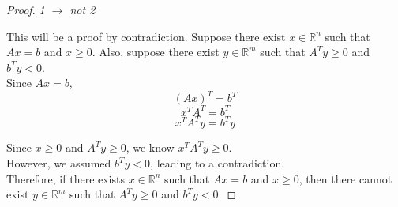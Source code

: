 \documentclass[11pt]{amsart} %
\theoremstyle{definition}
\begin{document}
\begin{proof} \textit{1 \(\xrightarrow{}\) not 2}

This will be a proof by contradiction. Suppose there exist \( x \in \mathbb{R}^n \) such that \( Ax = b \) and \( x \geq 0 \). Also, suppose there exist \( y \in \mathbb{R}^m \) such that \( A^T y \geq 0 \) and \( b^T y < 0 \).\\

Since \( Ax = b \),
\[
(Ax)^T = b^T
\]
\[
x^T A^T = b^T
\]
\[
x^T A^T y = b^T y
\]

Since \( x \geq 0 \) and \( A^T y \geq 0 \), we know \( x^T A^T y \geq 0 \).\\

However, we assumed \( b^T y < 0 \), leading to a contradiction.\\

Therefore, if there exists \( x \in \mathbb{R}^n \) such that \( Ax = b \) and \( x \geq 0 \), then there cannot exist \( y \in \mathbb{R}^m \) such that \( A^T y \geq 0 \) and \( b^T y < 0 \).

\end{proof}
\end{document}

